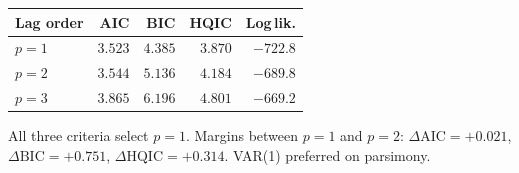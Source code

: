 
\begin{tabular}{lrrrr}
\toprule
Lag order & AIC & BIC & HQIC & Log\,lik. \\
\midrule
$p=1$ & $3.523$ & $4.385$ & $3.870$ & $-722.8$ \\
$p=2$ & $3.544$ & $5.136$ & $4.184$ & $-689.8$ \\
$p=3$ & $3.865$ & $6.196$ & $4.801$ & $-669.2$ \\
\bottomrule
\end{tabular}
\begin{tablenotes}
\small All three criteria select $p=1$. Margins between $p=1$ and $p=2$:
$\Delta\text{AIC}=+0.021$, $\Delta\text{BIC}=+0.751$, $\Delta\text{HQIC}=+0.314$.
VAR(1) preferred on parsimony.
\end{tablenotes}
